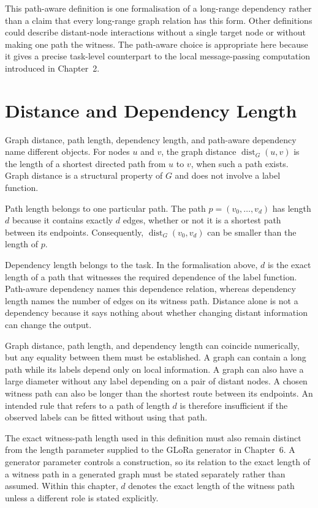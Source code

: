 This path-aware definition is one formalisation of a long-range dependency rather than a claim that every long-range graph relation has this form.
Other definitions could describe distant-node interactions without a single target node or without making one path the witness.
The path-aware choice is appropriate here because it gives a precise task-level counterpart to the local message-passing computation introduced in Chapter~2.

\section{Distance and Dependency Length}

Graph distance, path length, dependency length, and path-aware dependency name different objects.
For nodes \(u\) and \(v\), the graph distance \(\operatorname{dist}_G(u,v)\) is the length of a shortest directed path from \(u\) to \(v\), when such a path exists.
Graph distance is a structural property of \(G\) and does not involve a label function.

Path length belongs to one particular path.
The path \(p=(v_0,\ldots,v_d)\) has length \(d\) because it contains exactly \(d\) edges, whether or not it is a shortest path between its endpoints.
Consequently, \(\operatorname{dist}_G(v_0,v_d)\) can be smaller than the length of \(p\).

Dependency length belongs to the task.
In the formalisation above, \(d\) is the exact length of a path that witnesses the required dependence of the label function.
Path-aware dependency names this dependence relation, whereas dependency length names the number of edges on its witness path.
Distance alone is not a dependency because it says nothing about whether changing distant information can change the output.

Graph distance, path length, and dependency length can coincide numerically, but any equality between them must be established.
A graph can contain a long path while its labels depend only on local information.
A graph can also have a large diameter without any label depending on a pair of distant nodes.
A chosen witness path can also be longer than the shortest route between its endpoints.
An intended rule that refers to a path of length \(d\) is therefore insufficient if the observed labels can be fitted without using that path.

The exact witness-path length used in this definition must also remain distinct from the length parameter supplied to the GLoRa generator in Chapter~6.
A generator parameter controls a construction, so its relation to the exact length of a witness path in a generated graph must be stated separately rather than assumed.
Within this chapter, \(d\) denotes the exact length of the witness path unless a different role is stated explicitly.

